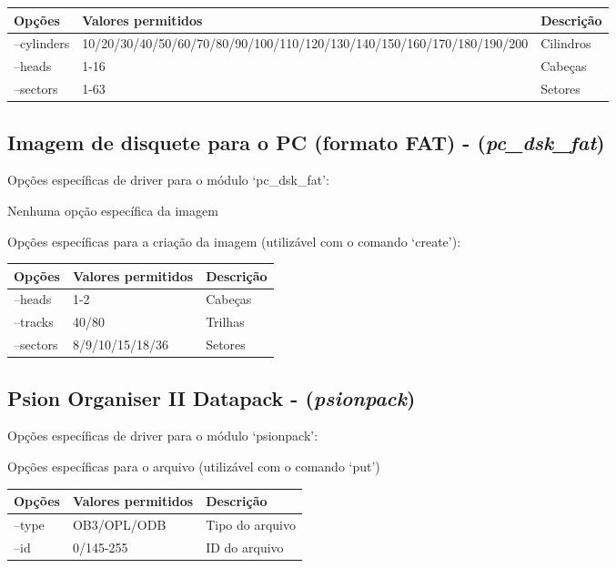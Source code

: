 \documentclass[letterpaper,10pt,brazil]{sphinxmanual}
\begin{document}
\noindent\begin{tabulary}{\linewidth}{|L|L|L|}
\hline

Opções
&
Valores permitidos
&
Descrição
\\
\hline
--cylinders
&
10/20/30/40/50/60/70/80/90/100/110/120/130/140/150/160/170/180/190/200
&
Cilindros
\\
\hline
--heads
&
1-16
&
Cabeças
\\
\hline
--sectors
&
1-63
&
Setores
\\
\hline\end{tabulary}



\subsection{Imagem de disquete para o PC (formato FAT) - (\emph{pc\_dsk\_fat})}
\label{tools/imgtool:imagem-de-disquete-para-o-pc-formato-fat-pc-dsk-fat}
Opções específicas de driver para o módulo `pc\_dsk\_fat':

Nenhuma opção específica da imagem

Opções específicas para a criação da imagem (utilizável com o comando `create'):

\noindent\begin{tabulary}{\linewidth}{|L|L|L|}
\hline

Opções
&
Valores permitidos
&
Descrição
\\
\hline
--heads
&
1-2
&
Cabeças
\\
\hline
--tracks
&
40/80
&
Trilhas
\\
\hline
--sectors
&
8/9/10/15/18/36
&
Setores
\\
\hline\end{tabulary}



\subsection{Psion Organiser II Datapack - (\emph{psionpack})}
\label{tools/imgtool:psion-organiser-ii-datapack-psionpack}
Opções específicas de driver para o módulo `psionpack':

Opções específicas para o arquivo (utilizável com o comando `put')

\noindent\begin{tabulary}{\linewidth}{|L|L|L|}
\hline

Opções
&
Valores permitidos
&
Descrição
\\
\hline
--type
&
OB3/OPL/ODB
&
Tipo do arquivo
\\
\hline
--id
&
0/145-255
&
ID do arquivo
\\
\hline\end{tabulary}
\end{document}
